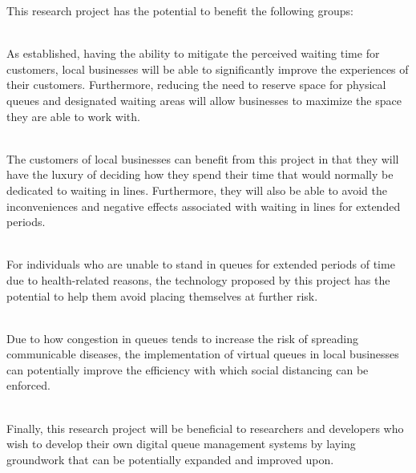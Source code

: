 This research project has the potential to benefit the following groups:

 \\
As established, having the ability to mitigate the perceived waiting time for customers, local businesses will be able to significantly improve the experiences of their customers. Furthermore, reducing the need to reserve space for physical queues and designated waiting areas will allow businesses to maximize the space they are able to work with.

 \\
The customers of local businesses can benefit from this project in that they will have the luxury of deciding how they spend their time that would normally be dedicated to waiting in lines. Furthermore, they will also be able to avoid the inconveniences and negative effects associated with waiting in lines for extended periods.

  \\
For individuals who are unable to stand in queues for extended periods of time due to health-related reasons, the technology proposed by this project has the potential to help them avoid placing themselves at further risk. 

 \\
Due to how congestion in queues tends to increase the risk of spreading communicable diseases, the implementation of virtual queues in local businesses can potentially improve the efficiency with which social distancing can be enforced. 

 \\
Finally, this research project will be beneficial to researchers and developers who wish to develop their own digital queue management systems by laying groundwork that can be potentially expanded and improved upon.


